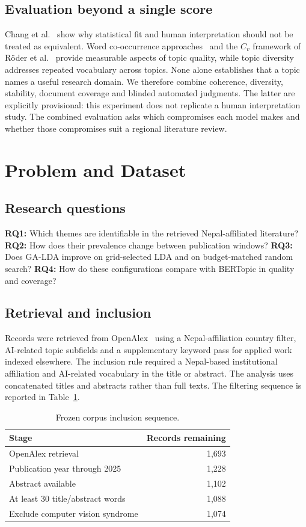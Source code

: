 \subsection{Evaluation beyond a single score}
Chang et al.~\cite{chang2009} show why statistical fit and human interpretation should not be
treated as equivalent. Word co-occurrence approaches~\cite{newman2010,mimno2011} and the
$C_v$ framework of R\"oder et al.~\cite{roder2015} provide measurable aspects of topic quality,
while topic diversity~\cite{dieng2020} addresses repeated vocabulary across topics. None alone
establishes that a topic names a useful research domain. We therefore combine coherence,
diversity, stability, document coverage and blinded automated judgments. The latter are explicitly
provisional: this experiment does not replicate a human interpretation study. The combined
evaluation asks which compromises each model makes and whether those compromises suit a
regional literature review.

\section{Problem and Dataset}
\label{sec:t1-data}

\subsection{Research questions}
\textbf{RQ1:} Which themes are identifiable in the retrieved Nepal-affiliated literature?
\textbf{RQ2:} How does their prevalence change between publication windows?
\textbf{RQ3:} Does GA-LDA improve on grid-selected LDA and on budget-matched random search?
\textbf{RQ4:} How do these configurations compare with BERTopic in quality and coverage?

\subsection{Retrieval and inclusion}
Records were retrieved from OpenAlex~\cite{priem2022} using a Nepal-affiliation country filter,
AI-related topic subfields and a supplementary keyword pass for applied work indexed elsewhere.
The inclusion rule required a Nepal-based institutional affiliation and AI-related vocabulary in
the title or abstract. The analysis uses concatenated titles and abstracts rather than full texts.
The filtering sequence is reported in Table~\ref{tab:funnel}.

\begin{table}[t]
\caption{Frozen corpus inclusion sequence.}
\label{tab:funnel}\centering\small
\begin{tabular}{@{}lr@{}}\toprule
Stage & Records remaining\\\midrule
OpenAlex retrieval & 1,693\\
Publication year through 2025 & 1,228\\
Abstract available & 1,102\\
At least 30 title/abstract words & 1,088\\
Exclude computer vision syndrome & 1,074\\\bottomrule
\end{tabular}
\end{table}

